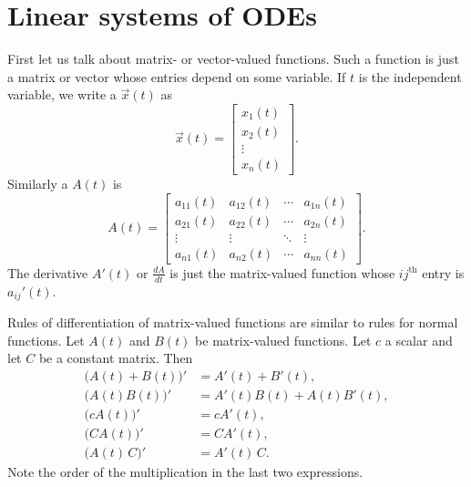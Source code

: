
\sectionnewpage
\section{Linear systems of ODEs}
\label{linsystems:section}


First let us talk about matrix- or vector-valued functions.  
Such a function is
just a matrix or vector whose entries depend on some variable.
If $t$ is the independent variable, we write a
\emph{}
$\vec{x}(t)$ as
\begin{equation*}
\vec{x}(t) = \begin{bmatrix}
x_1(t) \\
x_2(t) \\
\vdots \\
x_n(t)
\end{bmatrix} .
\end{equation*}
Similarly a \emph{} $A(t)$ is
\begin{equation*}
A(t) =
\begin{bmatrix}
a_{11}(t) & a_{12}(t) & \cdots & a_{1n}(t) \\
a_{21}(t) & a_{22}(t) & \cdots & a_{2n}(t) \\
\vdots & \vdots & \ddots & \vdots \\
a_{n1}(t) & a_{n2}(t) & \cdots & a_{nn}(t)
\end{bmatrix} .
\end{equation*}
The derivative $A'(t)$ or $\frac{dA}{dt}$ is
just the matrix-valued function
whose $ij^{\text{th}}$ entry is $a_{ij}'(t)$.

Rules of differentiation of matrix-valued functions
are similar to rules for normal
functions.  Let $A(t)$ and $B(t)$ be matrix-valued
functions.  Let $c$ a scalar and let $C$ be a constant matrix.
Then
\begin{align*}
\bigl(A(t)+B(t)\bigr)' & = A'(t) + B'(t), \\
\bigl(A(t)B(t)\bigr)' & = A'(t)B(t) + A(t)B'(t), \\
\bigl(cA(t)\bigr)' & = cA'(t), \\
\bigl(CA(t)\bigr)' & = CA'(t), \\
\bigl(A(t)\,C\bigr)' & = A'(t)\,C .
\end{align*}
Note the order of the multiplication in the last two expressions.

